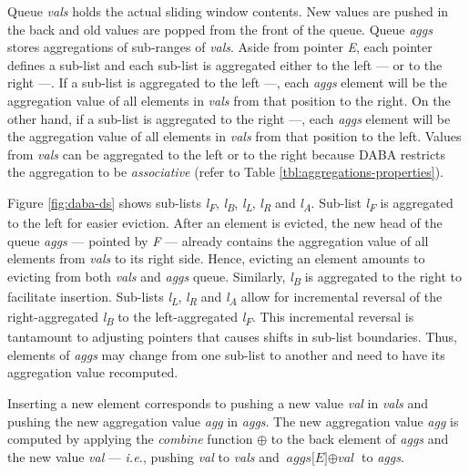 Queue \textit{vals} holds the actual sliding window contents. New values are pushed in the back and old values are popped from the front of the queue. Queue \textit{aggs} stores aggregations of sub-ranges of \textit{vals}. Aside from pointer \textit{E}, each pointer defines a sub-list and each sub-list is aggregated either to the left \textbullet--- or to the right ---\textbullet. If a sub-list is aggregated to the left \textbullet---, each \textit{aggs} element will be the aggregation value of all elements in \textit{vals} from that position to the right. On the other hand, if a sub-list is aggregated to the right ---\textbullet, each \textit{aggs} element will be the aggregation value of all elements in \textit{vals} from that position to the left. Values from \textit{vals} can be aggregated to the left or to the right because DABA restricts the aggregation to be \textit{associative} (refer to Table \ref{tbl:aggregations-properties}).

Figure \ref{fig:daba-ds} shows sub-lists \textit{l\textsubscript{F}}, \textit{l\textsubscript{B}}, \textit{l\textsubscript{L}}, \textit{l\textsubscript{R}} and \textit{l\textsubscript{A}}. Sub-list \textit{l\textsubscript{F}} is aggregated to the left for easier eviction. After an element is evicted, the new head of the queue \textit{aggs} --- pointed by \textit{F} --- already contains the aggregation value of all elements from \textit{vals} to its right side. Hence, evicting an element amounts to evicting from both \textit{vals} and \textit{aggs} queue. Similarly, \textit{l\textsubscript{B}} is aggregated to the right to facilitate insertion. Sub-lists \textit{l\textsubscript{L}}, \textit{l\textsubscript{R}} and \textit{l\textsubscript{A}} allow for incremental reversal of the right-aggregated \textit{l\textsubscript{B}} to the left-aggregated \textit{l\textsubscript{F}}. This incremental reversal is tantamount to adjusting pointers that causes shifts in sub-list boundaries. Thus, elements of \textit{aggs} may change from one sub-list to another and need to have its aggregation value recomputed.

Inserting a new element corresponds to pushing a new value \textit{val} in \textit{vals} and pushing the new aggregation value \textit{agg} in \textit{aggs}. The new aggregation value \textit{agg} is computed by applying the \textit{combine} function $\oplus$ to the back element of \textit{aggs} and the new value \textit{val} --- \textit{i.e.}, pushing \textit{val} to \textit{vals} and $\textit{aggs[E]} \oplus \textit{val}$ to \textit{aggs}. 

